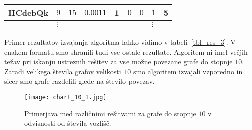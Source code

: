 \documentclass[12pt,a4paper,twoside]{article}
\theoremstyle{definition} %
\theoremstyle{plain} %
\numberwithin{equation}{section}  %
\begin{document}
\begin{table}[]
\begin{tabular}{lllllllll}
\multicolumn{1}{|l|}{HCdebQk}      & \multicolumn{1}{l|}{$9$}          & \multicolumn{1}{l|}{$15$}         & \multicolumn{1}{l|}{$0.0011$}        & \multicolumn{1}{l|}{1}          & \multicolumn{1}{l|}{$0$}                & \multicolumn{1}{l|}{$0$}              & \multicolumn{1}{l|}{$1$}              & \multicolumn{1}{l|}{5}              \\ \hline
                                   & $\vdots$                          &                                   &                                      &                                 &                                         &                                       & $\vdots$                              &                                    
\end{tabular}


\end{table}
Primer rezultatov izvajanja algoritma lahko vidimo v tabeli~\ref{tbl_res_3}. V enakem formatu smo shranili tudi vse ostale rezultate.
Algoritem ni imel večjih težav pri iskanju ustreznih rešitev za vse možne povezane grafe do stopnje $10$. Zaradi velikega števila grafov velikosti $10$ smo algoritem izvajali vzporedno in sicer smo grafe razdelili glede na število povezav.
 \begin{figure}[h!]
\caption{Primerjava med različnimi rešitvami za grafe do stopnje $10$ v odvisnosti od števila vozlišč.\label{chart_10_1}}

\centering
    \texttt{[image: chart\_10\_1.jpg]}
    \end{figure}
\end{document}

